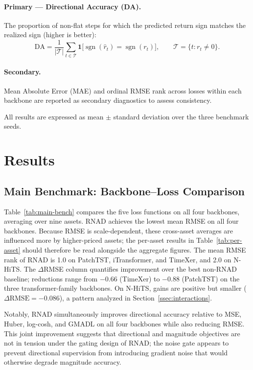 \documentclass[11pt]{article}
\newcommand{\RNAD}{RNAD\xspace}
\DeclareMathOperator{\sgn}{sgn}
\begin{document}
\paragraph{Primary --- Directional Accuracy (DA).}
The proportion of non-flat steps for which the predicted return sign
matches the realized sign (higher is better):
\begin{equation}
  \mathrm{DA}
  = \frac{1}{|\mathcal{T}|}\sum_{t \in \mathcal{T}}
    \mathbf{1}\bigl[\sgn(\hat{r}_t) = \sgn(r_t)\bigr],
  \qquad
  \mathcal{T} = \bigl\{t : r_t \neq 0\bigr\}.
  \label{eq:da}
\end{equation}

\paragraph{Secondary.}
Mean Absolute Error (MAE) and ordinal RMSE rank across losses within
each backbone are reported as secondary diagnostics to assess
consistency.

All results are expressed as mean $\pm$ standard deviation over the
three benchmark seeds.

\FloatBarrier
\section{Results}
\label{sec:results}

\subsection{Main Benchmark: Backbone--Loss Comparison}

Table~\ref{tab:main-bench} compares the five loss functions on all
four backbones, averaging over nine assets. \RNAD achieves the lowest
mean RMSE on all four backbones. Because RMSE is scale-dependent,
these cross-asset averages are influenced more by higher-priced assets;
the per-asset results in Table~\ref{tab:per-asset} should therefore
be read alongside the aggregate figures.
The mean RMSE rank of \RNAD is 1.0 on PatchTST, iTransformer, and
TimeXer, and 2.0 on N-HiTS. The $\Delta$RMSE column quantifies
improvement over the best non-\RNAD baseline; reductions range from
$-0.66$ (TimeXer) to $-0.88$ (PatchTST) on the three
transformer-family backbones. On N-HiTS, gains are positive but
smaller ($\Delta\mathrm{RMSE} = -0.086$), a pattern analyzed in
Section~\ref{ssec:interactions}.

Notably, \RNAD simultaneously improves directional accuracy relative
to MSE, Huber, log-cosh, and GMADL on all four backbones while also
reducing RMSE. This joint improvement suggests that directional and
magnitude objectives are not in tension under the gating design of
\RNAD; the noise gate appears to prevent directional supervision from
introducing gradient noise that would otherwise degrade magnitude
accuracy.
\end{document}
